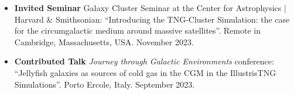 \documentclass[a4paper,12pt,oneside]{article}
\begin{document}
\begin{itemize}[wide, labelwidth=!, labelindent=-11pt, noitemsep]
    \item {\bf Invited Seminar} Galaxy Cluster Seminar at the Center for Astrophysics $\vert$ Harvard \& Smithsonian: ``Introducing the TNG-Cluster Simulation: the case for the circumgalactic medium around massive satellites''. Remote in Cambridge, Massachusetts, USA. November 2023. 
    \item {\bf Contributed Talk} {\it Journey through Galactic Environments} conference: ``Jellyfish galaxies as sources of cold gas in the CGM in the IllustrisTNG Simulations''. Porto Ercole, Italy. September 2023.

\end{itemize}
\end{document}

